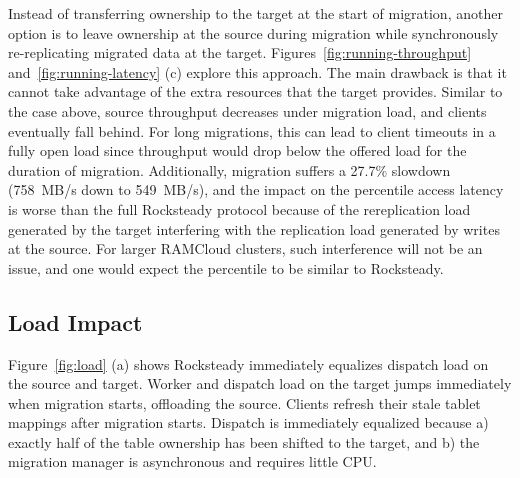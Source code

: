 Instead of transferring ownership to the target at the start of migration,
another option is to leave ownership at the source during migration
while synchronously re-replicating migrated data at the target.
Figures~\ref{fig:running-throughput} and~\ref{fig:running-latency} (c) explore
this approach. The main drawback is that it cannot take advantage of the
extra resources that the target provides. Similar to the
case above, source throughput decreases under migration load, and clients
eventually fall behind.  For long migrations, this can lead to client timeouts
in a fully open load since throughput would drop below the offered load
for the duration of migration.
Additionally, migration suffers a 27.7\% slowdown
(758~MB/s down to 549~MB/s), and the impact on the \nnnth
percentile access latency is worse than the full Rocksteady protocol
because of the rereplication load generated by the target interfering
with the replication load generated by writes at the source. For larger
RAMCloud clusters, such interference will not be an issue, and one would
expect the \nnnth percentile to be similar to Rocksteady.

\subsection{Load Impact}
\label{sec:eval-load}

Figure~\ref{fig:load} (a) shows Rocksteady immediately equalizes
dispatch load on the source and target. Worker and dispatch load on the
target jumps immediately when migration starts, offloading the source.
Clients refresh their stale tablet mappings after migration starts.
Dispatch is immediately equalized because
a) exactly half of the table ownership has been shifted to the target, and
b) the migration manager is asynchronous and requires little CPU.



%

